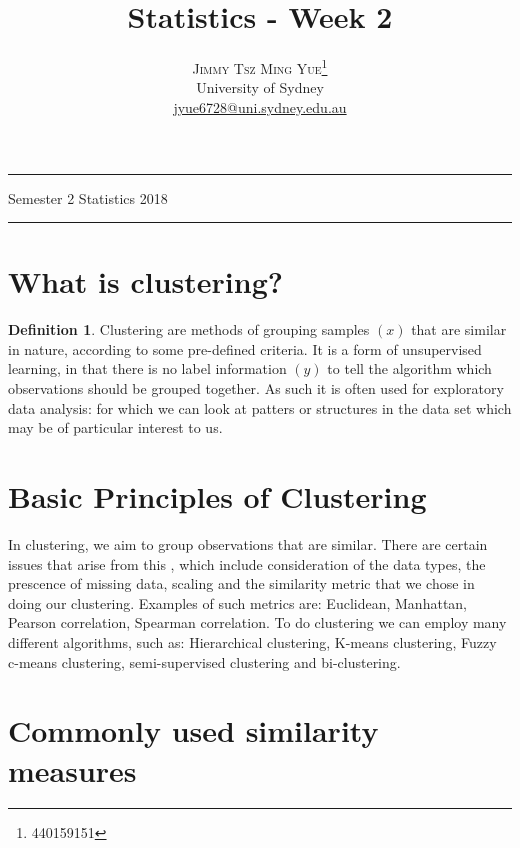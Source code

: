 \documentclass[twoside]{article}
\title{\vspace{-15mm}\fontsize{24pt}{10pt}\selectfont\textbf{Statistics - Week 2}} %
\author{
\large
\textsc{Jimmy Tsz Ming Yue}\thanks{440159151}\\[2mm] %
\normalsize University of Sydney \\ %
\normalsize \href{mailto:jyue6728@uni.sydney.edu.au}{jyue6728@uni.sydney.edu.au} %
\vspace{-5mm}
}
\date{}
\theoremstyle{definition}
\theoremstyle{definition}
\newtheorem*{proof1}{Definition}
\newenvironment{ddef}{\begin{dBox}\begin{proof1}}{\hfill{\scriptsize}\end{proof1}\end{dBox}}
\begin{document}
\maketitle %

\thispagestyle{fancy} %
\hrule \smallskip

\noindent Semester 2 \quad Statistics \hspace{10.5
cm} 2018
\smallskip
\hrule
\smallskip
\tableofcontents
\section{What is clustering?}

\begin{ddef}
	Clustering are methods of grouping samples $(x)$ that are similar in nature, according to some pre-defined criteria. It is a form of unsupervised learning, in that there is no label information $(y)$ to tell the algorithm which observations should be grouped together. As such it is often used for exploratory data analysis: for which we can look at patters or structures in the data set which may be of particular interest to us. 
\end{ddef}
\section{Basic Principles of Clustering}

In clustering, we aim to group observations that are similar. There are certain issues that arise from this , which include consideration of the data types, the prescence of missing data, scaling and the similarity metric that we chose in doing our clustering. Examples of such metrics are: Euclidean, Manhattan, Pearson correlation, Spearman correlation. To do clustering we can employ many different algorithms, such as: Hierarchical clustering, K-means clustering, Fuzzy c-means clustering, semi-supervised clustering and bi-clustering.

\section{Commonly used similarity measures}
\end{document}
